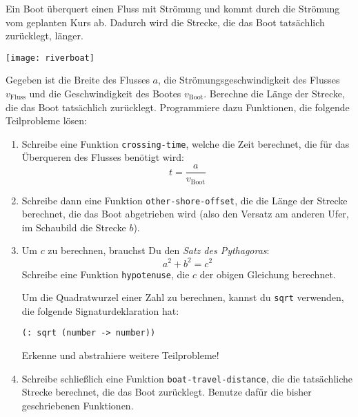\begin{aufgabe}

 Ein Boot überquert einen Fluss mit Strömung und
  kommt durch die Strömung vom geplanten Kurs ab.  Dadurch wird die
  Strecke, die das Boot tatsächlich zurücklegt, länger.

  \begin{center}
    \texttt{[image: riverboat]}
  \end{center}

  Gegeben ist die Breite des Flusses $a$, die Strömungsgeschwindigkeit
  des Flusses $v_{\text{Fluss}}$ und die Geschwindigkeit des Bootes
  $v_{\text{Boot}}$.  Berechne die Länge der Strecke, die das
  Boot tatsächlich zurücklegt.  Programmiere dazu Funktionen, die
  folgende Teilprobleme lösen:

  \begin{enumerate}
  \item Schreibe eine Funktion \lstinline{crossing-time}, welche die
    Zeit berechnet, die für das Überqueren des Flusses benötigt wird:
    \[t = \frac{a}{v_{\text{Boot}}}\]
  \item Schreibe dann eine Funktion \lstinline{other-shore-offset},
    die die Länge der Strecke berechnet, die das Boot abgetrieben wird
    (also den Versatz am anderen Ufer, im Schaubild die Strecke $b$).

  \item Um $c$ zu berechnen, brauchst Du den \textit{Satz des
      Pythagoras}:
    \begin{displaymath}
      a^2 + b^2 = c^2
    \end{displaymath}
    Schreibe eine Funktion \lstinline{hypotenuse},
    die $c$ der obigen Gleichung berechnet.

    Um die Quadratwurzel einer Zahl zu berechnen,
    kannst du \lstinline{sqrt} verwenden, die folgende
    Signaturdeklaration hat:
\begin{lstlisting}
(: sqrt (number -> number))
\end{lstlisting}
    Erkenne und abstrahiere weitere Teilprobleme!

  \item Schreibe schließlich eine Funktion
    \lstinline{boat-travel-distance}, die die tatsächliche Strecke
    berechnet, die das Boot zurücklegt.  Benutze dafür die bisher
    geschriebenen Funktionen.
  \end{enumerate}
\end{aufgabe}

